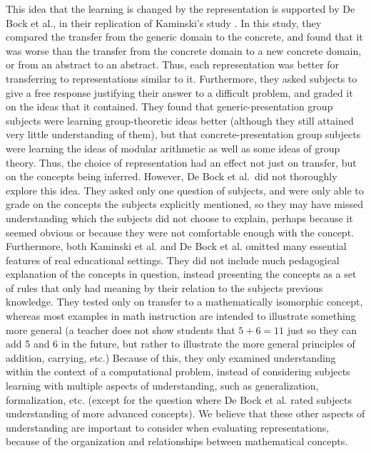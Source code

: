 \documentclass[11pt]{article}
\begin{document}
This idea that the learning is changed by the representation is supported by De Bock et al., in their replication of Kaminski's study \cite{DeBock2011}. In this study, they compared the transfer from the generic domain to the concrete, and found that it was worse than the transfer from the concrete domain to a new concrete domain, or from an abstract to an abstract. Thus, each representation was better for transferring to representations similar to it. Furthermore, they asked subjects to give a free response justifying their answer to a difficult problem, and graded it on the ideas that it contained. They found that generic-presentation group subjects were learning group-theoretic ideas better (although they still attained very little understanding of them), but that concrete-presentation group subjects were learning the ideas of modular arithmetic as well as some ideas of group theory. Thus, the choice of representation had an effect not just on transfer, but on the concepts being inferred. However, De Bock et al.\ did not thoroughly explore this idea. They asked only one question of subjects, and were only able to grade on the concepts the subjects explicitly mentioned, so they may have missed understanding which the subjects did not choose to explain, perhaps because it seemed obvious or because they were not comfortable enough with the concept.\\[11pt]
Furthermore, both Kaminski et al. and De Bock et al. omitted many essential features of real educational settings. They did not include much pedagogical explanation of the concepts in question, instead presenting the concepts as a set of rules that only had meaning by their relation to the subjects previous knowledge. They tested only on transfer to a mathematically isomorphic concept, whereas most examples in math instruction are intended to illustrate something more general (a teacher does not show students that $5+6 = 11$ just so they can add 5 and 6 in the future, but rather to illustrate the more general principles of addition, carrying, etc.) Because of this, they only examined understanding within the context of a computational problem, instead of considering subjects learning with multiple aspects of understanding, such as generalization, formalization, etc. (except for the question where De Bock et al. rated subjects understanding of more advanced concepts). We believe that these other aspects of understanding are important to consider when evaluating representations, because of the organization and relationships between mathematical concepts.
\end{document}
